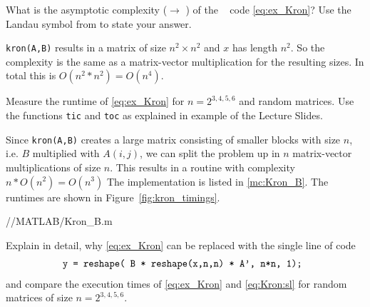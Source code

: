 \begin{problem}

\begin{subproblem}[1] \label{subprb:Kron_3}
What is the asymptotic complexity ($\to$ ) 
of the \Matlab~ code \eqref{eq:ex_Kron}? Use the Landau symbol
from  to state your answer. 

\begin{solution}
\texttt{kron(A,B)} results in a matrix of size $n^2 \times n^2$ and $x$ has length $n^2$. So the complexity is the same as a matrix-vector multiplication for the resulting sizes. In total this is $O(n^2*n^2)=O(n^4)$.
\end{solution}
\end{subproblem}


\begin{subproblem}[2] \label{subprb:Kron_4} Measure the runtime of
  \eqref{eq:ex_Kron} for $n=2^{3,4,5,6}$ and random matrices. Use the \matlab{} functions
  \texttt{tic} and \texttt{toc} as explained in example  of
  the Lecture Slides.
  
 \begin{solution}
Since \texttt{kron(A,B)} creates a large matrix consisting of smaller blocks with size $n$, i.e. $B$ multiplied with $A(i,j)$, we can split the problem up in $n$ matrix-vector multiplications of size $n$. This results in a routine with complexity $n*O(n^2)=O(n^3)$ 
The implementation is listed in \ref{mc:Kron_B}.
The runtimes are shown in Figure~\ref{fig:kron_timings}.


{\problems/\chpt/MATLAB/Kron_B.m}
 \end{solution}

\end{subproblem}


\begin{subproblem}[2] \label{subprb:Kron_5}
  Explain in detail, why \eqref{eq:ex_Kron} can be replaced with the single line
  of \matlab{} code
  \begin{gather}
    \label{eq:Kron:sl}
    \text{\texttt{y = reshape( B * reshape(x,n,n) * A', n*n, 1); }}
  \end{gather}
  and compare the execution times of \eqref{eq:ex_Kron} and \eqref{eq:Kron:sl} for
  random matrices of size $n=2^{3,4,5,6}$.
  

\end{subproblem}
\end{problem}
